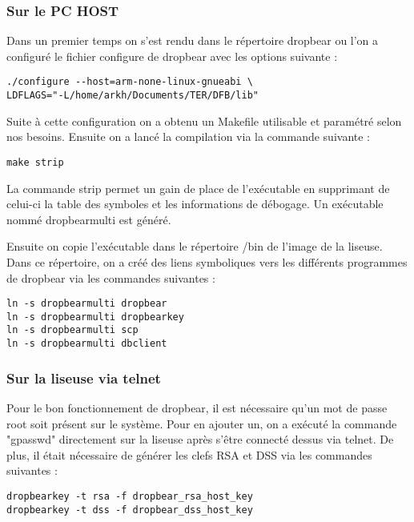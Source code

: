 \subsubsection{Sur le PC HOST}

Dans un premier temps on s'est rendu dans le répertoire dropbear ou l'on a configuré le fichier configure de dropbear avec les options suivante :

\begin{lstlisting}
./configure --host=arm-none-linux-gnueabi \
LDFLAGS="-L/home/arkh/Documents/TER/DFB/lib"
\end{lstlisting} 

Suite à cette configuration on a obtenu un Makefile utilisable et paramétré selon nos besoins.
Ensuite on a lancé la compilation via la commande suivante :

\begin{lstlisting}
make strip
\end{lstlisting}

La commande strip permet un gain de place de l'exécutable en supprimant de celui-ci la table des symboles et les informations de débogage. Un exécutable nommé dropbearmulti est généré.

Ensuite on copie l'exécutable dans le répertoire /bin de l'image de la liseuse. Dans ce répertoire, on a créé des liens symboliques vers les différents programmes de dropbear via les commandes suivantes :

\begin{lstlisting}
ln -s dropbearmulti dropbear
ln -s dropbearmulti dropbearkey
ln -s dropbearmulti scp
ln -s dropbearmulti dbclient
\end{lstlisting}  

\subsubsection{Sur la liseuse via telnet}

Pour le bon fonctionnement de dropbear, il est nécessaire qu'un mot de passe root soit présent sur le système. Pour en ajouter un, on a exécuté la commande "gpasswd" directement sur la liseuse après s'être connecté dessus via telnet.
De plus, il était nécessaire de générer les clefs RSA et DSS via les commandes suivantes :

\begin{lstlisting}
dropbearkey -t rsa -f dropbear_rsa_host_key
dropbearkey -t dss -f dropbear_dss_host_key
\end{lstlisting}

